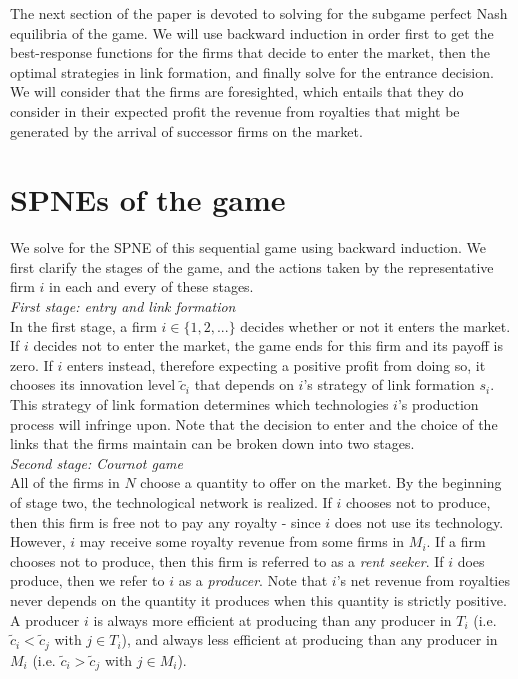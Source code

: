 \documentclass{article}
\begin{document}
\indent The next section of the paper is devoted to solving for the subgame perfect Nash equilibria of the game. We will use backward induction in order first to get the best-response functions for the firms that decide to enter the market, then the optimal strategies in link formation, and finally solve for the entrance decision. We will consider that the firms are foresighted, which entails that they do consider in their expected profit the revenue from royalties that might be generated by the arrival of successor firms on the market. 

\section{SPNEs of the game }

\indent We solve for the SPNE of this sequential game using backward induction. We first clarify the stages of the game, and the actions taken by the representative firm $i$ in each and every of these stages. \\

\textit{First stage: entry and link formation }\\

\indent In the first stage, a firm $i\in \{1,2,...\}$ decides whether or not it enters the market. If $i$ decides not to enter the market, the game ends for this firm and its payoff is zero. If $i$ enters instead, therefore expecting a positive profit from doing so, it chooses its innovation level $\tilde{c}_i$ that depends on $i$'s strategy of link formation $s_i$. This strategy of link formation determines which technologies $i$'s production process will infringe upon. Note that the decision to enter and the choice of the links that the firms maintain can be broken down into two stages. \\

\textit{Second stage: Cournot game }\\

\indent All of the firms in $N$ choose a quantity to offer on the market. By the beginning of stage two, the technological network  is realized. If $i$ chooses not to produce, then this firm is free not to pay any royalty - since $i$ does not use its technology. However, $i$ may receive some royalty revenue from some firms in $M_i$. If a firm chooses not to produce, then this firm is referred to as a \textit{rent seeker}. If $i$ does produce, then we refer to $i$ as a \textit{producer}. Note that $i$'s net revenue from royalties never depends on the quantity it produces when this quantity is strictly positive. A producer $i$ is always more efficient at producing than any producer in $T_i$ (i.e. $\tilde{c}_i<\tilde{c}_j$ with $j\in T_i$), and always less efficient at producing than any producer in $M_i$ (i.e. $\tilde{c}_i>\tilde{c}_j$ with $j\in M_i$).  \\
\end{document}
